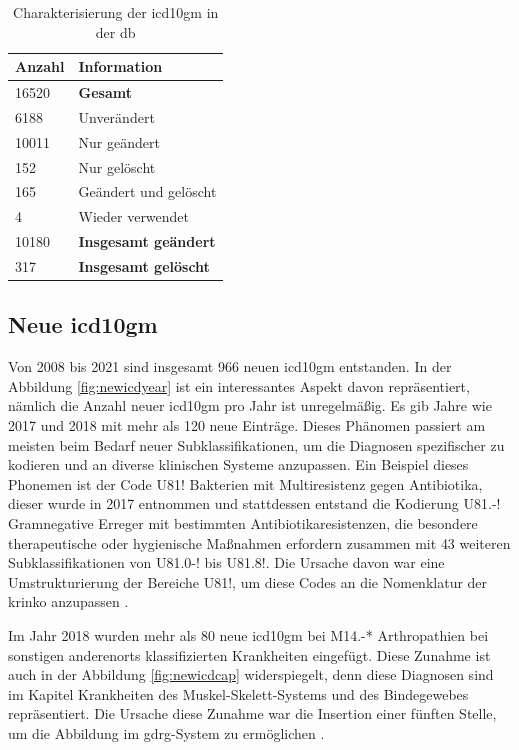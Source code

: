  \begin{table}[ht]
 	\centering
 	\small
 	\caption[\acs{icd10gm} in der \acs{db}]{Charakterisierung der \acs{icd10gm} in der \ac{db}}
 	\label{tab:icddb}
 	\begin{tabular}{|l|l|}
 		\hline
 		\rowcolor{lightgray}	Anzahl & Information \\ \hline 
 		16520 & \textbf{Gesamt} \\ \hline
 		\hline
 		6188 & Unverändert \\ \hline
 		10011 & Nur geändert \\ \hline
 		152 & Nur gelöscht \\ \hline 		
 		165 & Geändert und gelöscht \\ \hline
 		4 & Wieder verwendet \\ \hline
 		\hline
 		10180 & \textbf{Insgesamt geändert} \\ \hline
 		317 & \textbf{Insgesamt gelöscht} \\ \hline
 		
 		
 	\end{tabular}
 \end{table}

\subsection{Neue \acs{icd10gm}} \label{newicd}

Von 2008 bis 2021 sind insgesamt \textsf{966} neuen \ac{icd10gm} entstanden. In der Abbildung \ref{fig:newicdyear} ist ein interessantes Aspekt davon repräsentiert, nämlich die Anzahl neuer \ac{icd10gm} pro Jahr ist unregelmäßig. Es gib Jahre wie 2017 und 2018 mit mehr als \textsf{120} neue Einträge. Dieses Phänomen passiert am meisten beim Bedarf neuer Subklassifikationen, um die Diagnosen spezifischer zu kodieren und an diverse klinischen Systeme anzupassen. Ein Beispiel dieses Phonemen ist der Code \textsf{U81!} \textsf{Bakterien mit Multiresistenz gegen Antibiotika}, dieser wurde in 2017 entnommen und stattdessen entstand die Kodierung \textsf{U81.-!} \textsf{Gramnegative Erreger mit bestimmten Antibiotikaresistenzen, die besondere therapeutische oder hygienische Maßnahmen erfordern} zusammen mit \textsf{43} weiteren Subklassifikationen von \textsf{U81.0-!} bis \textsf{U81.8!}. Die Ursache davon war eine Umstrukturierung der Bereiche \textsf{U81!}, um diese Codes an die Nomenklatur der \ac{krinko} anzupassen \cite{erreg17}.

Im Jahr 2018 wurden mehr als \textsf{80} neue \ac{icd10gm} bei \textsf{M14.-*} \textsf{Arthropathien bei sonstigen anderenorts klassifizierten Krankheiten} eingefügt. Diese Zunahme ist auch in der Abbildung \ref{fig:newicdcap} widerspiegelt, denn diese Diagnosen sind im Kapitel \textsf{Krankheiten des Muskel-Skelett-Systems und des Bindegewebes} repräsentiert. Die Ursache diese Zunahme war die Insertion einer fünften Stelle, um die Abbildung im \ac{gdrg}-System zu ermöglichen \cite{musk18}.

